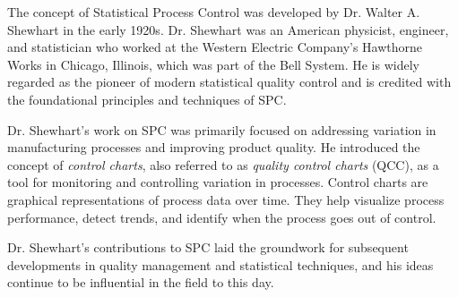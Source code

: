 \documentclass{ximera}
\begin{document}
\begin{center}
      \end{center}

The concept of Statistical Process Control was developed by Dr. Walter A. Shewhart in the early 1920s. Dr. Shewhart was an American physicist, engineer, and statistician who worked at the Western Electric Company's Hawthorne Works in Chicago, Illinois, which was part of the Bell System. He is widely regarded as the pioneer of modern statistical quality control and is credited with the foundational principles and techniques of SPC.

Dr. Shewhart's work on SPC was primarily focused on addressing variation in manufacturing processes and improving product quality. He introduced the concept of \emph{control charts}, also referred to as \emph{quality control charts} (QCC), as a tool for monitoring and controlling variation in processes. Control charts are graphical representations of process data over time. They help visualize process performance, detect trends, and identify when the process goes out of control.

Dr. Shewhart's contributions to SPC laid the groundwork for subsequent developments in quality management and statistical techniques, and his ideas continue to be influential in the field to this day.


 
\end{document}
